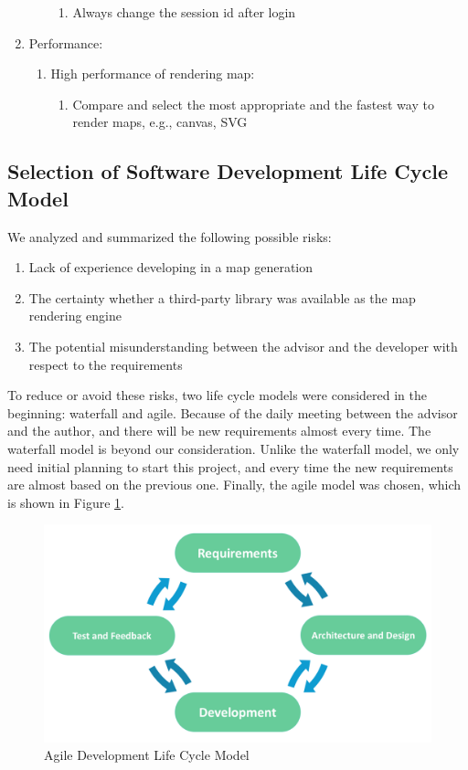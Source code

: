 \begin{enumerate}
\begin{enumerate}
\begin{enumerate}
      \item Always change the session id after login
    \end{enumerate}
  \end{enumerate}
  \item Performance:
  \begin{enumerate}
    \item High performance of rendering map:
    \begin{enumerate}
      \item Compare and select the most appropriate and the fastest way to render maps, e.g., canvas, SVG
    \end{enumerate}
  \end{enumerate}
\end{enumerate}

\subsection{Selection of Software Development Life Cycle Model}
We analyzed and summarized the following possible risks:
\begin{enumerate}
  \item Lack of experience developing in a map generation
  \item The certainty whether a third-party library was available as the map rendering engine
  \item The potential misunderstanding between the advisor and the developer with respect to the requirements
\end{enumerate}

To reduce or avoid these risks, two life cycle models were considered in the beginning: waterfall and agile. Because of the daily meeting between the advisor and the author, and there will be new requirements almost every time. The waterfall model is beyond our consideration. Unlike the waterfall model, we only need initial planning to start this project, and every time the new requirements are almost based on the previous one. Finally, the agile model was chosen, which is shown in Figure \ref{Agile Model}.

\begin{figure}[htb]
\centering
\includegraphics[width=\textwidth]{section02/assets/agile.png}
\caption[Agile Development Life Cycle Model]{\label{Agile Model}Agile Development Life Cycle Model}
\end{figure}

